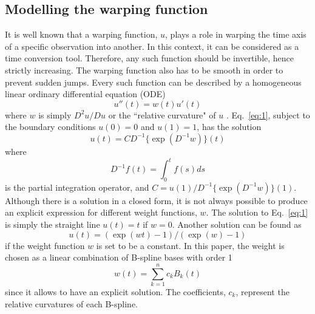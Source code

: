 \documentclass[number,1p,12pt]{elsarticle}
\begin{document}
\subsection{Modelling the warping function}
It is well known that a warping function, $u$, plays a role in warping the time axis of a specific observation into another. In this context, it can be considered as a time conversion tool. Therefore, any such function should be invertible, hence strictly increasing. The warping function also has to be smooth in order to prevent sudden jumps. Every such function can be described by a homogeneous linear ordinary differential equation (ODE)
\begin{equation}
 u''(t) = w(t)u'(t) \label{eq:1}
\end{equation}
where $w$ is simply $D^2u/Du$ or the ``relative curvature" of $u$ \cite{Ramsay1998a}. 
Eq.~\ref{eq:1}, subject to the boundary conditions $u(0)=0$ and $u(1)=1$, has the solution
\begin{equation}
 u(t) = CD^{-1}\{\exp(D^{-1}w)\}(t) \label{eq:2}
\end{equation}
where 
\begin{equation}
D^{-1} f(t) =  \int_0^t f(s)ds \label{eq:3}
\end{equation}
is the partial integration operator, and $C=u(1)/D^{-1}\{\exp(D^{-1}w)\}(1)$. Although there is a solution in a closed form, it is not always possible to produce an explicit expression for different weight functions, $w$. The solution to Eq.~\ref{eq:1} is simply the straight line $u(t)=t$ if $w=0$. Another solution can be found as
\begin{equation}
u(t)= (\exp(wt)-1)/(\exp(w)-1)
\end{equation}
if the weight function $w$ is set to be a constant. In this paper, the weight is chosen as a linear combination of B-spline bases with order 1
\begin{equation}
 w(t)=\sum_{k=1}^nc_kB_k(t) \label{eq:4}
\end{equation}
since it allows to have an explicit solution. The coefficients, $c_k$, represent the relative curvatures of each B-spline. 
\end{document}
